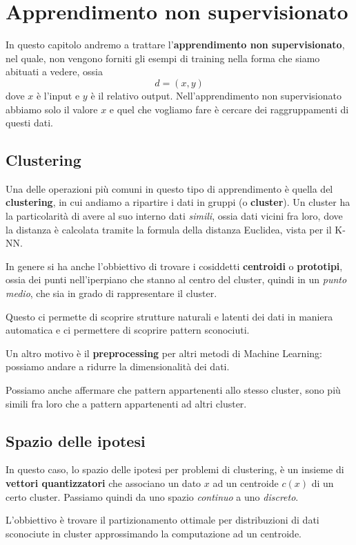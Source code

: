 \chapter{Apprendimento non supervisionato}
In questo capitolo andremo a trattare l'\textbf{apprendimento non supervisionato}, nel quale, non vengono forniti gli
esempi di training nella forma che siamo abituati a vedere, ossia
\[ d = (x, y) \]
dove $x$ \`e l'input e $y$ \`e il relativo output. Nell'apprendimento non supervisionato abbiamo solo il valore $x$ e
quel che vogliamo fare \`e cercare dei raggruppamenti di questi dati.

\section{Clustering}
Una delle operazioni pi\`u comuni in questo tipo di apprendimento \`e quella del \textbf{clustering}, in cui andiamo
a ripartire i dati in gruppi (o \textbf{cluster}). Un cluster ha la particolarit\`a di avere al suo interno dati
\emph{simili}, ossia dati vicini fra loro, dove la distanza \`e calcolata tramite la formula della distanza Euclidea,
vista per il K-NN.

In genere si ha anche l'obbiettivo di trovare i cosiddetti \textbf{centroidi} o \textbf{prototipi}, ossia dei punti
nell'iperpiano che stanno al centro del cluster, quindi in un \emph{punto medio}, che sia in grado di rappresentare il
cluster.

Questo ci permette di scoprire strutture naturali e latenti dei dati in maniera automatica e ci permettere di scoprire
pattern sconociuti.

Un altro motivo \`e il \textbf{preprocessing} per altri metodi di Machine Learning: possiamo andare a ridurre la
dimensionalit\`a dei dati.

Possiamo anche affermare che pattern appartenenti allo stesso cluster, sono pi\`u simili fra loro che a pattern
appartenenti ad altri cluster.

\section{Spazio delle ipotesi}
In questo caso, lo spazio delle ipotesi per problemi di clustering, \`e un insieme di \textbf{vettori quantizzatori}
che associano un dato $x$ ad un centroide $c(x)$ di un certo cluster. Passiamo quindi da uno spazio \emph{continuo}
a uno \emph{discreto}.

L'obbiettivo \`e trovare il partizionamento ottimale per distribuzioni di dati sconociute in cluster approssimando
la computazione ad un centroide.

